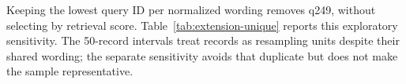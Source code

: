 \ifpaperextensionunique
Keeping the lowest query ID per normalized wording removes q249, without selecting by retrieval score. Table~\ref{tab:extension-unique} reports this exploratory sensitivity. The 50-record intervals treat records as resampling units despite their shared wording; the separate sensitivity avoids that duplicate but does not make the sample representative.
\begin{table}[p]
\centering
\caption{Five principal systems on the unique-wording subset of the extension. Initial labels and query-bootstrap intervals; remaining systems and paired statistics are preserved in the result JSON.}
\label{tab:extension-unique}

\end{table}
\fi

\else
{}
\fi
